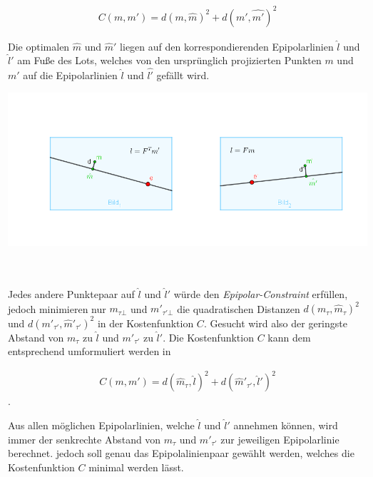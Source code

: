 \begin{gather}
	C(m,m') = d(m,\hat{m})^2 + d(m',\hat{m'})^2
\end{gather}


Die optimalen $\hat{m}$ und $\hat{m}'$ liegen auf den korrespondierenden Epipolarlinien $\hat{l}$ und $\hat{l}'$ am Fuße des Lots, welches von den ursprünglich projizierten Punkten $m$ und $m'$ auf die Epipolarlinien $\hat{l}$ und $\hat{l'}$ gefällt wird\cite{HZ}. 


\begin{minipage}{\linewidth}
	\centering
	\includegraphics[width=.8\linewidth]{images/SampsAppxNewPoints.png}
\end{minipage}\\\\

Jedes andere Punktepaar auf $\hat{l}$ und $\hat{l}'$ würde den \textit{Epipolar-Constraint} erfüllen, jedoch minimieren nur $m_{\tau\bot}$ und $m'_{\tau' \bot}$ die quadratischen Distanzen $d(m_\tau,\hat{m}_\tau)^2$ und $ d(m'_{\tau'},\hat{m}'_{\tau'})^2$ in der Kostenfunktion $C$. Gesucht wird also der geringste Abstand von $m_\tau$ zu $\hat{l}$ und $m'_{\tau'}$ zu $\hat{l}'$. Die Kostenfunktion $C$ kann dem entsprechend umformuliert werden in 

\begin{gather}
	C(m,m') = d(\hat{m}_\tau,\hat{l})^2 + d(\hat{m}'_{\tau'},\hat{l}')^2
\end{gather}
.

Aus allen möglichen Epipolarlinien, welche $\hat{l}$ und $\hat{l}'$ annehmen können, wird immer der senkrechte Abstand von $m_\tau$ und $m'_{\tau'}$ zur jeweiligen Epipolarlinie berechnet. jedoch soll genau das Epipolalinienpaar gewählt werden, welches die Kostenfunktion $C$ minimal werden lässt\cite{HZ}.\\


